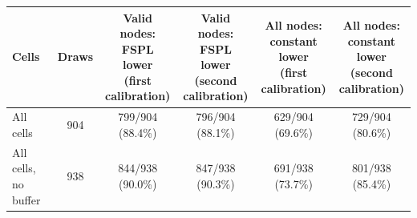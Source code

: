 \begin{tabular}{lccccc}
\toprule
Cells & Draws & \celula{Valid \\ \relax nodes: FSPL \\ \relax lower \\ \relax (first \\ \relax calibration)} & \celula{Valid \\ \relax nodes: FSPL \\ \relax lower \\ \relax (second \\ \relax calibration)} & \celula{All nodes: \\ \relax constant \\ \relax lower \\ \relax (first \\ \relax calibration)} & \celula{All nodes: \\ \relax constant \\ \relax lower \\ \relax (second \\ \relax calibration)} \\
\midrule
All cells & 904 & 799/904 (88.4\%) & 796/904 (88.1\%) & 629/904 (69.6\%) & 729/904 (80.6\%) \\
All cells, no buffer & 938 & 844/938 (90.0\%) & 847/938 (90.3\%) & 691/938 (73.7\%) & 801/938 (85.4\%) \\
\bottomrule
\end{tabular}
